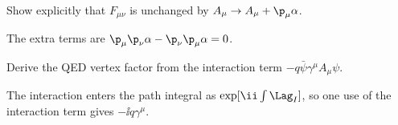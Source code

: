 \begin{exercise}
Show explicitly that \(F_{\mu\nu}\) is unchanged by \(A_\mu\to A_\mu+\p_\mu\alpha\).
\begin{answer}
The extra terms are \(\p_\mu\p_\nu\alpha-\p_\nu\p_\mu\alpha=0\).
\end{answer}
\end{exercise}

\begin{exercise}
Derive the QED vertex factor from the interaction term \(-q\bar\psi\gamma^\mu A_\mu\psi\).
\begin{answer}
The interaction enters the path integral as \(\exp[\ii\int\Lag_I]\), so one use of the interaction term gives \(-\ii q\gamma^\mu\).
\end{answer}
\end{exercise}
